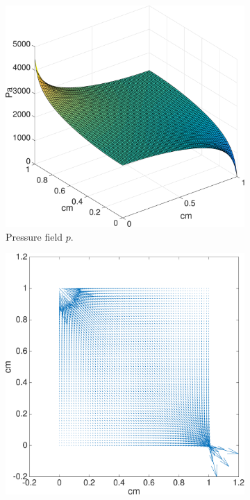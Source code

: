 \documentclass[paper=a4, fontsize=11pt,parskip=half,headings=small]{scrartcl}
\begin{document}
	\begin{figure}[H]
		\centering
            \begin{subfigure}[b]{0.3\textwidth}
				\includegraphics[width=\textwidth]{figs/pressure.eps}
                \caption{Pressure field $p$.}
            \end{subfigure} 
            \begin{subfigure}[b]{0.3\textwidth}
				\includegraphics[width=\textwidth]{figs/flowQuiver.eps}

\end{subfigure}
\end{figure}
\end{document}
